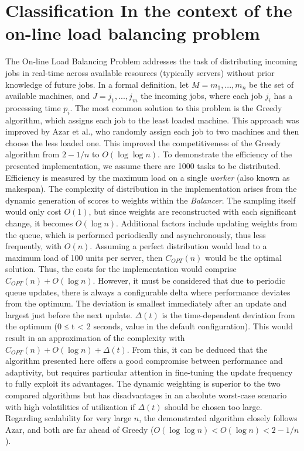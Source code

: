 \documentclass[twocolumn]{webofc}
\begin{document}
    \section{Classification In the context of the on-line load balancing problem}
    The On-line Load Balancing Problem addresses the task of distributing incoming jobs in real-time across available resources (typically servers) without prior knowledge of future jobs. In a formal definition, let \( M = {m_1, ..., m_n} \) be the set of available machines, and \( J = {j_1, ..., j_m} \) the incoming jobs, where each job $j_i$ has a processing time $p_i$. The most common solution to this problem is the Greedy algorithm, which assigns each job to the least loaded machine\cite{encyclopedia_greedy}. This approach was improved by Azar et al.\cite{AZAR199473}, who randomly assign each job to two machines and then choose the less loaded one. This improved the competitiveness of the Greedy algorithm from $2 - 1/n$ to $O(\log \log n)$. To demonstrate the efficiency of the presented implementation, we assume there are 1000 tasks to be distributed. Efficiency is measured by the maximum load on a single \textit{worker} (also known as makespan). The complexity of distribution in the implementation arises from the dynamic generation of scores to weights within the \textit{Balancer}. The sampling itself would only cost $O(1)$, but since weights are reconstructed with each significant change, it becomes $O(\log n)$. Additional factors include updating weights from the queue, which is performed periodically and asynchronously, thus less frequently, with $O(n)$. Assuming a perfect distribution would lead to a maximum load of 100 units per server, then $C_{OPT}(n)$ would be the optimal solution. Thus, the costs for the implementation would comprise $C_{OPT}(n) + O(\log n)$. However, it must be considered that due to periodic queue updates, there is always a configurable delta where performance deviates from the optimum. The deviation is smallest immediately after an update and largest just before the next update. $\Delta(t)$ is the time-dependent deviation from the optimum (0 ≤ t < 2 seconds, value in the default configuration). This would result in an approximation of the complexity with $C_{OPT}(n) + O(\log n) + \Delta(t)$. From this, it can be deduced that the algorithm presented here offers a good compromise between performance and adaptivity, but requires particular attention in fine-tuning the update frequency to fully exploit its advantages. The dynamic weighting is superior to the two compared algorithms but has disadvantages in an absolute worst-case scenario with high volatilities of utilization if $\Delta(t)$ should be chosen too large. Regarding scalability for very large $n$, the demonstrated algorithm closely follows Azar, and both are far ahead of Greedy ($O(\log \log n) < O(\log n) < 2 - 1/n$).
\end{document}
